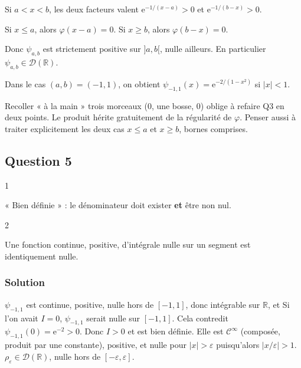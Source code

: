 \documentclass[11pt,a4paper]{article}
\newcommand{\equationajustee}[1]{%
  \sbox{\boiteequation}{$\displaystyle #1$}%
  \ifdim\wd\boiteequation>\linewidth
    \[\resizebox{\linewidth}{!}{\usebox{\boiteequation}}\]%
  \else
    \[#1\]%
  \fi}
\begin{document}
Si \(a<x<b\), les deux facteurs valent \(\mathrm e^{-1/(x-a)}>0\) et \(\mathrm e^{-1/(b-x)}>0\).

Si \(x\leqslant a\), alors \(\varphi(x-a)=0\). Si \(x\geqslant b\), alors \(\varphi(b-x)=0\).

Donc \(\psi_{a,b}\) est strictement positive sur \(]a,b[\), nulle ailleurs. En particulier \(\psi_{a,b}\in\mathcal D(\mathbb R)\).

Dans le cas \((a,b)=(-1,1)\), on obtient \(\psi_{-1,1}(x)=\mathrm e^{-2/(1-x^2)}\) si \(|x|<1\).

\begin{piege}

Recoller « à la main » trois morceaux (\(0\), une bosse, \(0\)) oblige à refaire Q3 en deux points. Le produit hérite gratuitement de la régularité de \(\varphi\). Penser aussi à traiter explicitement les deux cas \(x\leqslant a\) et \(x\geqslant b\), bornes comprises.

\end{piege}

\hypertarget{question-5}{%
\subsection{Question 5}\label{question-5}}

\begin{indication}{1}

« Bien définie » : le dénominateur doit exister \textbf{et} être non nul.

\end{indication}

\begin{indication}{2}

Une fonction continue, positive, d'intégrale nulle sur un segment est identiquement nulle.

\end{indication}

\hypertarget{solution-4}{%
\subsubsection{Solution}\label{solution-4}}

\(\psi_{-1,1}\) est continue, positive, nulle hors de \([-1,1]\), donc intégrable sur \(\mathbb R\), et
\equationajustee{I=\int_{\mathbb R}\psi_{-1,1}=\int_{-1}^1\psi_{-1,1}.}
Si l'on avait \(I=0\), \(\psi_{-1,1}\) serait nulle sur \([-1,1]\). Cela contredit \(\psi_{-1,1}(0)=\mathrm e^{-2}>0\). Donc \(I>0\) et
\equationajustee{\rho_\varepsilon(x)=\frac1{\varepsilon I}\,\psi_{-1,1}\!\left(\frac x\varepsilon\right)}
est bien définie. Elle est \(\mathcal C^\infty\) (composée, produit par une constante), positive, et nulle pour \(|x|>\varepsilon\) puisqu'alors \(|x/\varepsilon|>1\). \textbf{\(\rho_\varepsilon\in\mathcal D(\mathbb R)\)}, nulle hors de \([-\varepsilon,\varepsilon]\).
\end{document}
